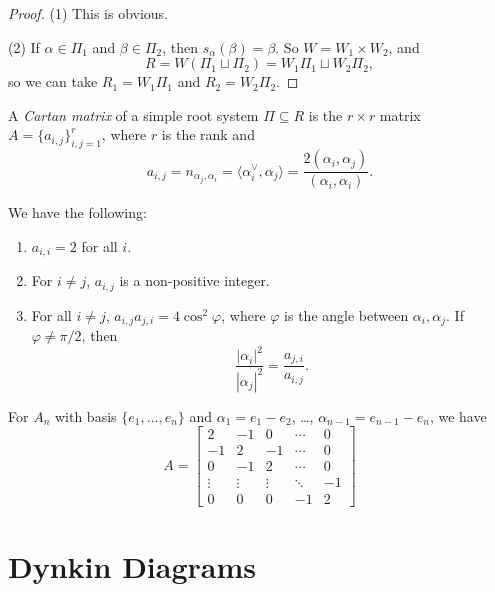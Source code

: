 \begin{proof}
  (1) This is obvious.

  (2) If $\alpha \in \Pi_1$ and
  $\beta \in \Pi_2$, then
  $s_\alpha(\beta) = \beta$.
  So $W = W_1 \times W_2$, and
  \[R = W(\Pi_1 \sqcup \Pi_2) = W_1 \Pi_1 \sqcup W_2 \Pi_2,\]
  so we can take $R_1 = W_1 \Pi_1$
  and $R_2 = W_2 \Pi_2$.
\end{proof}

\begin{definition}
  A \emph{Cartan matrix} of a
  simple root system $\Pi \subseteq R$
  is the $r \times r$ matrix $A = \{a_{i, j}\}_{i, j = 1}^r$, where
  $r$ is the rank and
  \[
    a_{i, j} = n_{\alpha_j, \alpha_i}
    = \langle \alpha_i^\vee, \alpha_j \rangle
    = \frac{2(\alpha_i, \alpha_j)}{(\alpha_i, \alpha_i)}.
  \]
\end{definition}

\begin{lemma}
  We have the following:
  \begin{enumerate}
    \item $a_{i, i} = 2$ for all $i$.
    \item For $i \ne j$,
      $a_{i, j}$ is a non-positive
      integer.
    \item For all $i \ne j$,
      $a_{i, j} a_{j, i} = 4\cos^2 \varphi$,
      where $\varphi$ is the angle
      between $\alpha_i, \alpha_j$.
      If $\varphi \ne \pi / 2$, then
      \[
        \frac{|\alpha_i|^2}{|\alpha_j|^2}
        = \frac{a_{j, i}}{a_{i, j}}.
      \]
  \end{enumerate}
\end{lemma}

\begin{example}
  For $A_n$ with basis
  $\{e_1, \dots, e_n\}$ and
  $\alpha_1 = e_1 - e_2$, \dots,
  $\alpha_{n - 1} = e_{n - 1} - e_n$,
  we have
  \[
    A =
    \begin{bmatrix}
      2 & -1 & 0 & \cdots & 0 \\
      -1 & 2 & -1 & \cdots & 0 \\
      0 & -1 & 2 & \cdots & 0 \\
      \vdots & \vdots & \vdots & \ddots & -1 \\
      0 & 0 & 0 & -1 & 2
    \end{bmatrix}
  \]
\end{example}

\section{Dynkin Diagrams}

